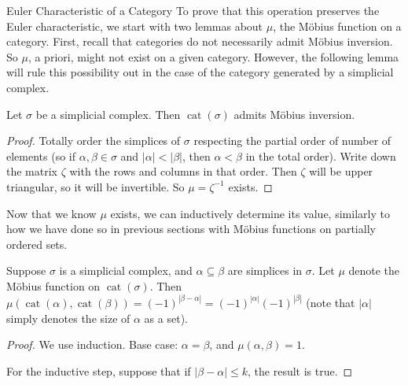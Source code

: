 \documentclass[12pt]{pom_thesis}
\DeclareMathOperator{\cat}{cat}
\begin{document}
\begin{chapter}{Euler Characteristic of a Category}
To prove that this operation preserves the Euler characteristic, we start with two lemmas about $\mu$, the M\"obius function on a category. First, recall that categories do not necessarily admit M\"obius inversion. So $\mu$, a priori, might not exist on a given category. However, the following lemma will rule this possibility out in the case of the category generated by a simplicial complex.
\begin{lemma}\label{mu_exists}
Let $\sigma$ be a simplicial complex. Then $\cat(\sigma)$ admits M\"obius inversion.
\end{lemma}
\begin{proof}
Totally order the simplices of $\sigma$ respecting the partial order of number of elements (so if $\alpha, \beta \in \sigma$ and $|\alpha| < |\beta|$, then $\alpha < \beta$ in the total order). Write down the matrix $\zeta$ with the rows and columns in that order. Then $\zeta$ will be upper triangular, so it will be invertible. So $\mu = \zeta^{-1}$ exists.
\end{proof}
Now that we know $\mu$ exists, we can inductively determine its value, similarly to how we have done so in previous sections with M\"obius functions on partially ordered sets.
\begin{lemma}
\label{mu_lemma}
Suppose $\sigma$ is a simplicial complex, and $\alpha \subseteq \beta$ are simplices in $\sigma$. Let $\mu$ denote the M\"obius function on $\cat(\sigma)$. Then $\mu(\cat(\alpha), \cat(\beta)) =(-1)^{|\beta - \alpha|} = (-1)^{|\alpha|} (-1)^{|\beta|}$ (note that $|\alpha|$ simply denotes the size of $\alpha$ as a set).
\end{lemma}
\begin{proof}
We use induction. Base case: $\alpha = \beta$, and $\mu(\alpha, \beta)=1$.

For the inductive step, suppose that if $|\beta-\alpha| \leq k$, the result is true.


\end{proof}
\end{chapter}
\end{document}
